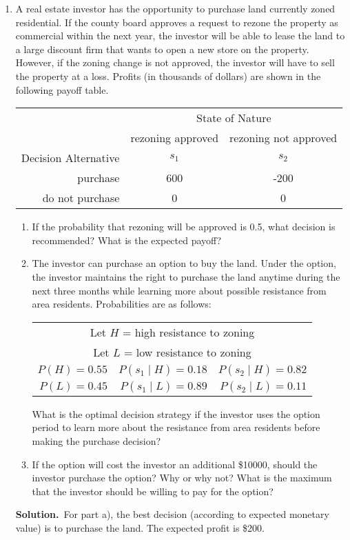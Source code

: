 \documentclass[12pt]{book}
\newcommand{\bs}{\textbf{Solution.}~}
\begin{document}
\begin{enumerate}
\item A real estate investor has the opportunity to purchase land currently
zoned residential. If the county board approves a request to rezone the property
as commercial within the next year, the investor will be able to lease the
land to a large discount firm that wants to open a new store on the property.
However, if the zoning change is not approved, the investor will have to sell
the property at a loss. Profits (in thousands of dollars) are shown in the 
following payoff table.

\begin{tabular}{rcc}
& \multicolumn{2}{c}{State of Nature} \\
& rezoning approved & rezoning not approved \\
Decision Alternative & $s_1$ & $s_2$ \\
purchase & 600 & -200\\
do not purchase & 0 & 0
\end{tabular}

\begin{enumerate}
    \item If the probability that rezoning will be approved is 0.5, what
    decision is recommended? What is the expected payoff?
    \item The investor can purchase an option to buy the land. Under the option,
    the investor maintains the right to purchase the land anytime during the next
    three months while learning more about possible resistance from area residents.
    Probabilities are as follows:
    
    \begin{tabular}{rrr}
    \multicolumn{3}{c}{Let $H$ = high resistance to zoning}\\
    \multicolumn{3}{c}{Let $L$ = low resistance to zoning}\\
    $P(H)=0.55$ & $P(s_1 \mid H)=0.18$ & $P(s_2 \mid H)=0.82$ \\
    $P(L)=0.45$ & $P(s_1 \mid L)=0.89$ & $P(s_2 \mid L)=0.11$ 
    \end{tabular}
    
    What is the optimal decision strategy if the investor uses the option
    period to learn more about the resistance from area residents before making
    the purchase decision?
    \item If the option will cost the investor an additional \$\num{10000}, 
    should the investor purchase the option? Why or why not? What is the maximum
    that the investor should be willing to pay for the option?
\end{enumerate}
\begin{solution}
\bs For part a), the best decision (according to expected monetary value)
is to purchase the land. The expected profit is \$200.


\end{solution}
\end{enumerate}
\end{document}
